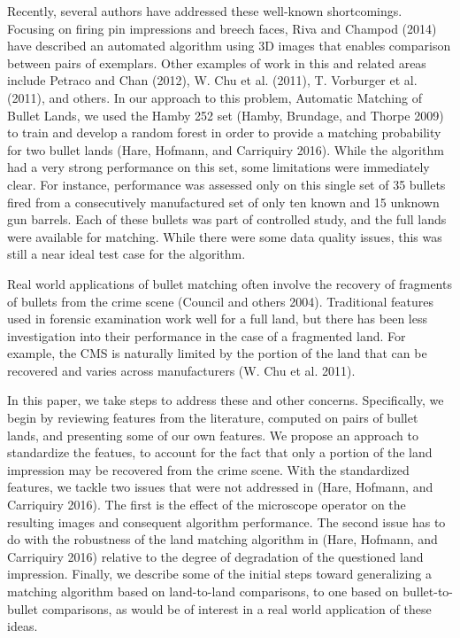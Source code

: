 \documentclass[12pt,]{article}
\theoremstyle{definition}
\theoremstyle{definition}
\theoremstyle{definition}
\theoremstyle{remark}
\begin{document}
Recently, several authors have addressed these well-known shortcomings.
Focusing on firing pin impressions and breech faces, Riva and Champod
(2014) have described an automated algorithm using 3D images that
enables comparison between pairs of exemplars. Other examples of work in
this and related areas include Petraco and Chan (2012), W. Chu et al.
(2011), T. Vorburger et al. (2011), and others. In our approach to this
problem, Automatic Matching of Bullet Lands, we used the Hamby 252 set
(Hamby, Brundage, and Thorpe 2009) to train and develop a random forest
in order to provide a matching probability for two bullet lands (Hare,
Hofmann, and Carriquiry 2016). While the algorithm had a very strong
performance on this set, some limitations were immediately clear. For
instance, performance was assessed only on this single set of 35 bullets
fired from a consecutively manufactured set of only ten known and 15
unknown gun barrels. Each of these bullets was part of controlled study,
and the full lands were available for matching. While there were some
data quality issues, this was still a near ideal test case for the
algorithm.

Real world applications of bullet matching often involve the recovery of
fragments of bullets from the crime scene (Council and others 2004).
Traditional features used in forensic examination work well for a full
land, but there has been less investigation into their performance in
the case of a fragmented land. For example, the CMS is naturally limited
by the portion of the land that can be recovered and varies across
manufacturers (W. Chu et al. 2011).

In this paper, we take steps to address these and other concerns.
Specifically, we begin by reviewing features from the literature,
computed on pairs of bullet lands, and presenting some of our own
features. We propose an approach to standardize the featues, to account
for the fact that only a portion of the land impression may be recovered
from the crime scene. With the standardized features, we tackle two
issues that were not addressed in (Hare, Hofmann, and Carriquiry 2016).
The first is the effect of the microscope operator on the resulting
images and consequent algorithm performance. The second issue has to do
with the robustness of the land matching algorithm in (Hare, Hofmann,
and Carriquiry 2016) relative to the degree of degradation of the
questioned land impression. Finally, we describe some of the initial
steps toward generalizing a matching algorithm based on land-to-land
comparisons, to one based on bullet-to-bullet comparisons, as would be
of interest in a real world application of these ideas.
\end{document}
